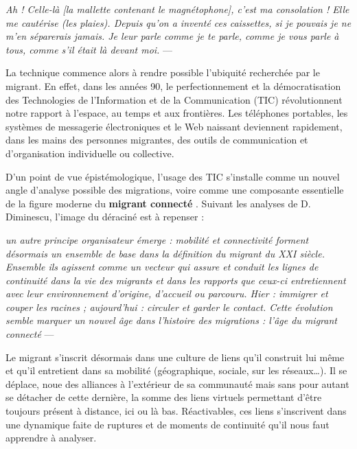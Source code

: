 \documentclass[symmetric,justified,marginals=raggedouter]{tufte-book}
\begin{document}
\begin{fullwidth}
\og\textit{Ah ! Celle-là [la mallette contenant le magnétophone], c'est ma consolation ! Elle me cautérise (les plaies). Depuis qu'on a inventé ces caissettes, si je pouvais je ne m'en séparerais jamais. Je leur parle comme je te parle, comme je vous parle à tous, comme s'il était là devant moi.}\fg{} --- \citep[p.12]{sayad_du_1985}\\
\end{fullwidth}

\noindent La technique commence alors à rendre possible l'ubiquité recherchée par le migrant. En effet, dans les années 90, le perfectionnement et la démocratisation des Technologies de l'Information et de la Communication (TIC) révolutionnent notre rapport à l'espace, au temps et aux frontières. Les téléphones portables, les systèmes de messagerie électroniques et le Web naissant deviennent rapidement, dans les mains des personnes migrantes, des outils de communication et d'organisation individuelle ou collective. 

D'un point de vue épistémologique, l'usage des TIC s'installe comme un nouvel angle d'analyse possible des migrations, voire comme une composante essentielle de la figure moderne du \textbf{migrant connecté} \citep{diminescu_connected_2008}. Suivant les analyses de D. Diminescu, l'image du déraciné est à repenser :\\

\begin{fullwidth}
\og\textit{un autre principe organisateur émerge : mobilité et connectivité forment désormais un ensemble de base dans la définition du migrant du XXI siècle. Ensemble ils agissent comme un vecteur qui assure et conduit les lignes de continuité dans la vie des migrants et dans les rapports que ceux-ci entretiennent avec leur environnement d’origine, d’accueil ou parcouru. Hier : immigrer et couper les racines ; aujourd’hui : circuler et garder le contact. Cette évolution semble marquer un nouvel âge dans l’histoire des migrations : l’âge du migrant connecté}\fg{} --- \citep[p.3]{diminescu_connected_2008}\\
\end{fullwidth}

\noindent Le migrant s'inscrit désormais dans une culture de liens qu'il construit lui même et qu'il entretient dans sa mobilité (géographique, sociale, sur les réseaux\ldots{}). Il se déplace, noue des alliances à l'extérieur de sa communauté mais sans pour autant se détacher de cette dernière, la somme des liens virtuels permettant d'être toujours présent à distance, ici ou là bas. Réactivables, ces liens s'inscrivent dans une dynamique faite de ruptures et de moments de continuité qu'il nous faut apprendre à analyser. 
\end{document}
